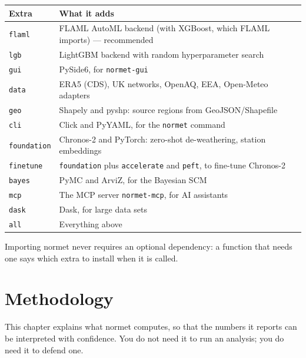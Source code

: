 \documentclass[11pt]{report}
\newcommand{\nm}{\textsf{normet}}
\newcommand{\codeunderscore}{\textunderscore\allowbreak}
\newcommand{\code}[1]{\texttt{\let\_\codeunderscore #1}}
\begin{document}
\begin{center}\small
\begin{tabular}{@{}ll@{}}
\toprule
Extra & What it adds \\
\midrule
\code{flaml}      & FLAML AutoML backend (with XGBoost, which FLAML imports) --- recommended \\
\code{lgb}        & LightGBM backend with random hyperparameter search \\
\code{gui}        & PySide6, for \code{normet-gui} \\
\code{data}       & ERA5 (CDS), UK networks, OpenAQ, EEA, Open-Meteo adapters \\
\code{geo}        & Shapely and pyshp: source regions from GeoJSON/Shapefile \\
\code{cli}        & Click and PyYAML, for the \code{normet} command \\
\code{foundation} & Chronos-2 and PyTorch: zero-shot de-weathering, station embeddings \\
\code{finetune}   & \code{foundation} plus \code{accelerate} and \code{peft}, to fine-tune Chronos-2 \\
\code{bayes}      & PyMC and ArviZ, for the Bayesian SCM \\
\code{mcp}        & The MCP server \code{normet-mcp}, for AI assistants \\
\code{dask}       & Dask, for large data sets \\
\code{all}        & Everything above \\
\bottomrule
\end{tabular}
\end{center}

Importing \nm{} never requires an optional dependency: a function that needs one says
which extra to install when it is called.

\chapter{Methodology}\label{ch:theory}

This chapter explains what \nm{} computes, so that the numbers it reports can be
interpreted with confidence. You do not need it to run an analysis; you do need it to
defend one.
\end{document}
